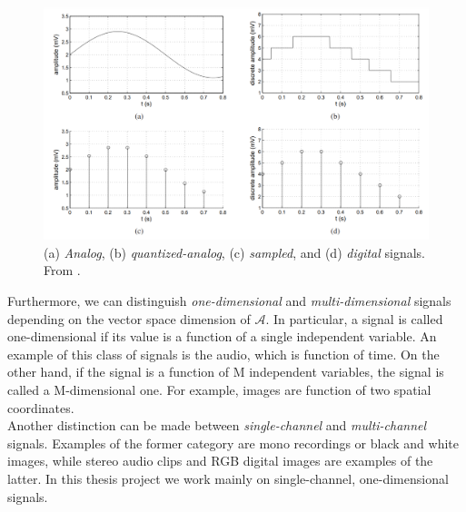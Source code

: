 \begin{figure}[H]
	\begin{center}
		\includegraphics[scale=0.57]{img/signals.png}
		\captionsetup{margin=2cm}
		\caption{ (a) \textit{Analog}, (b) \textit{quantized-analog}, (c) \textit{sampled}, and (d) \textit{digital} signals. From \cite{avanzini2005fundamentals}.} 
		\label{fig:signals}
	\end{center}
\end{figure}
\noindent Furthermore, we can distinguish \textit{one-dimensional} and \textit{multi-dimensional} signals depending on the vector space dimension of $\mathcal{A}$. In particular, a signal is called one-dimensional if its value is a function of a single independent variable. An example of this class of signals is the audio, which is function of time. On the other hand, if the signal is a function of M independent variables, the signal is called a M-dimensional one. For example, images are function of two spatial coordinates. \\
Another distinction can be made between \textit{single-channel} and \textit{multi-channel} signals. Examples of the former category are mono recordings or black and white images, while stereo audio clips and RGB digital images are examples of the latter. In this thesis project we work mainly on single-channel, one-dimensional signals.

